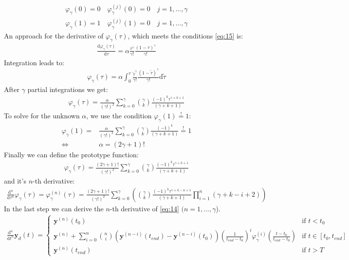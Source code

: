 \documentclass[a4paper,11pt,headings=standardclasses,parskip=half]{scrartcl}
\renewcommand{\d}{\mathrm{d}} %
\newcommand{\py}{\emph{Python}\xspace}
\begin{document}
\begin{subequations}
\label{eq:15}
\begin{align}
\varphi_\gamma(0)=0 \quad \varphi^{(j)}_\gamma(0)=0 \quad j = 1,...,\gamma \\
\varphi_\gamma(1)=1 \quad \varphi^{(j)}_\gamma(1)=0 \quad j = 1,...,\gamma 
\end{align}
\end{subequations}
An approach for the derivative of $\varphi_\gamma(\tau)$, which meets the conditions \eqref{eq:15} is:
\begin{align}
\frac{\d \varphi_\gamma(\tau)}{\d \tau} = \alpha \frac{\tau^{\gamma}}{\gamma!}\frac{(1-\tau)^{\gamma}}{\gamma!}
\end{align}
Integration leads to:
\begin{align}
\varphi_\gamma(\tau) = \alpha \int_0^\tau\frac{\tilde{\tau}^{\gamma}}{\gamma!}\frac{(1-\tilde{\tau})^{\gamma}}{\gamma!} \d \tilde{\tau}
\end{align}
After $\gamma$ partial integrations we get:
\begin{align*}
\varphi_\gamma(\tau)= \frac{\alpha}{(\gamma!)^2} \sum_{k=0}^{\gamma} \binom{\gamma}{k} \frac{(-1)^k\tau^{\gamma+k+1}}{(\gamma+k+1)}
\end{align*}
To solve for the unknown $\alpha$, we use the condition $\varphi_\gamma(1)\overset{!}{=}1$:
\begin{align*}
\varphi_\gamma(1)= &\frac{\alpha}{(\gamma!)^2} \sum_{k=0}^{\gamma} \binom{\gamma}{k} \frac{(-1)^k}{(\gamma+k+1)} \overset{!}{=} 1 \\
\Leftrightarrow \quad & \alpha = (2\gamma+1)!
\end{align*}
Finally we can define the prototype function:
\begin{align}
\varphi_\gamma(\tau)= \frac{(2\gamma+1)!}{(\gamma!)^2} \sum_{k=0}^{\gamma} \binom{\gamma}{k} \frac{(-1)^k\tau^{\gamma+k+1}}{(\gamma+k+1)}
\end{align}
and it's $n$-th derivative:
\begin{align}
\frac{\d^n }{\d \tau^n}\varphi_\gamma(\tau)=\varphi_\gamma^{(n)}(\tau)= \frac{(2\gamma+1)!}{(\gamma!)^2} \sum_{k=0}^{\gamma} \left(\binom{\gamma}{k} \frac{(-1)^k\tau^{\gamma+k-n+1}}{(\gamma+k+1)}\prod_{i=1}^n(\gamma+k-i+2)\right)
\end{align}
In the last step we can derive the $n$-th derivative of \eqref{eq:14} $(n=1,...,\gamma$).
\begin{align}
\frac{\d^n}{\d t^n}\mathbf{y}_d(t) = \begin{cases} \mathbf{y}^{(n)}(t_0) & \textrm{if } t<t_0 \\ \mathbf{y}^{(n)} + \sum_{i=0}^{n}\binom{n}{i}(\mathbf{y}^{(n-i)}(t_{end})-\mathbf{y}^{(n-i)}(t_0))\left(\frac{1}{t_{end}-t_0}\right)^i\varphi_\gamma^{(i)}\left(\frac{t-t_0}{t_{end}-t_0}\right) &\textrm{if } t \in [t_0, t_{end}] \\ \mathbf{y}^{(n)}(t_{end})&\textrm{if } t>T\end{cases}
\end{align}

\printglossaries
\end{document}
